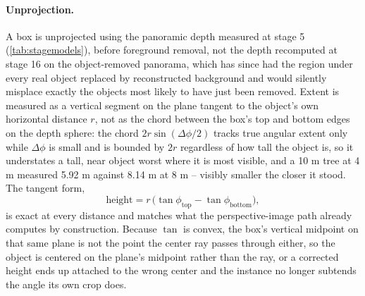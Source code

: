 \paragraph{Unprojection.} A box is unprojected using the panoramic depth measured at
stage 5 (\cref{tab:stagemodels}), before foreground removal, not the depth
recomputed at stage 16 on the object-removed panorama, which has since had the
region under every real object replaced by reconstructed background and would
silently misplace exactly the objects most likely to have just been removed. Extent
is measured as a vertical segment on the plane tangent to the object's own
horizontal distance $r$, not as the chord between the box's top and bottom edges on
the depth sphere: the chord $2r\sin(\Delta\phi/2)$ tracks true angular extent only
while $\Delta\phi$ is small and is bounded by $2r$ regardless of how tall the object
is, so it understates a tall, near object worst where it is most visible, and a
10 m tree at 4 m measured 5.92 m against 8.14 m at 8 m -- visibly smaller the closer
it stood. The tangent form,
\begin{equation}
  \text{height} = r\,\big(\tan\phi_{\text{top}} - \tan\phi_{\text{bottom}}\big),
\end{equation}
is exact at every distance and matches what the perspective-image path already
computes by construction. Because $\tan$ is convex, the box's vertical midpoint on
that same plane is not the point the center ray passes through either, so the
object is centered on the plane's midpoint rather than the ray, or a corrected
height ends up attached to the wrong center and the instance no longer subtends the
angle its own crop does.

